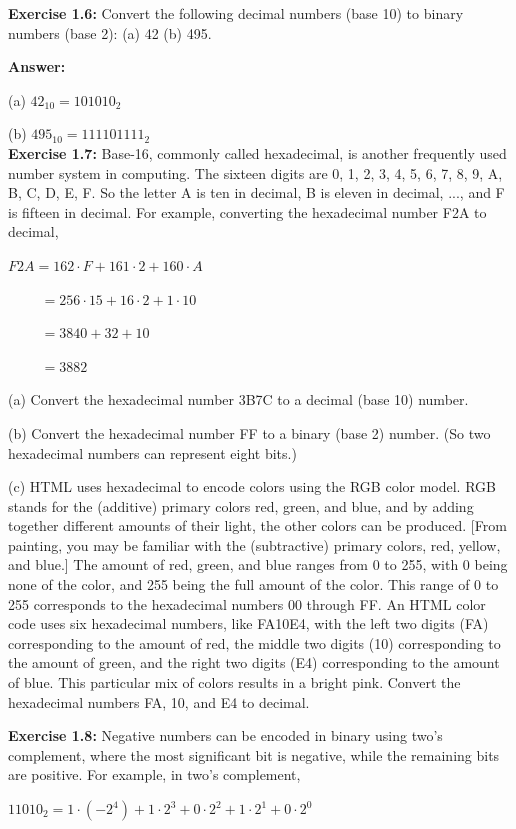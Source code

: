 \documentclass[12pt]{article}
\begin{document}
\textbf{Exercise 1.6:} Convert the following decimal numbers (base 10) to binary numbers (base 2): (a) 42 (b) 495.

\textbf{Answer:}

(a) \(42_{10} = 101010_{2}\)

(b) \(495_{10} = 111101111_{2}\)\\

\textbf{Exercise 1.7:} Base-16, commonly called hexadecimal, is another frequently used number system in computing. The sixteen digits are 0, 1, 2, 3, 4, 5, 6, 7, 8, 9, A, B, C, D, E, F. So the letter A is ten in decimal, B is eleven in decimal, ..., and F is fifteen in decimal. For example, converting the hexadecimal number F2A to decimal,

\(F2A = 162 \cdot F + 161 \cdot 2 + 160 \cdot A\)

\(\quad\quad\,\,= 256 \cdot 15 + 16 \cdot 2 + 1 \cdot 10\)

\(\quad\quad\,\,= 3840 + 32 + 10\)

\(\quad\quad\,\,= 3882\)

(a) Convert the hexadecimal number 3B7C to a decimal (base 10) number.

(b) Convert the hexadecimal number FF to a binary (base 2) number. (So two hexadecimal numbers can represent eight bits.)

(c) HTML uses hexadecimal to encode colors using the RGB color model. RGB stands for the (additive) primary colors red, green, and blue, and by adding together different amounts of their light, the other colors can be produced. [From painting, you may be familiar with the (subtractive) primary colors, red, yellow, and blue.] The amount of red, green, and blue ranges from 0 to 255, with 0 being none of the color, and 255 being the full amount of the color. This range of 0 to 255 corresponds to the hexadecimal numbers 00 through FF. An HTML color code uses six hexadecimal numbers, like FA10E4, with the left two digits (FA) corresponding to the amount of red, the middle two digits (10) corresponding to the amount of green, and the right two digits (E4) corresponding to the amount of blue. This particular mix of colors results in a bright pink. Convert the hexadecimal numbers FA, 10, and E4 to decimal.

\textbf{Exercise 1.8:} Negative numbers can be encoded in binary using two’s complement, where the most significant bit is negative, while the remaining bits are positive. For example, in two’s complement, 

\(11010_{2} = 1 \cdot (-2^{4}) + 1 \cdot 2^{3} + 0 \cdot 2^{2} + 1 \cdot 2^{1} + 0 \cdot 2^{0}\)
\end{document}
